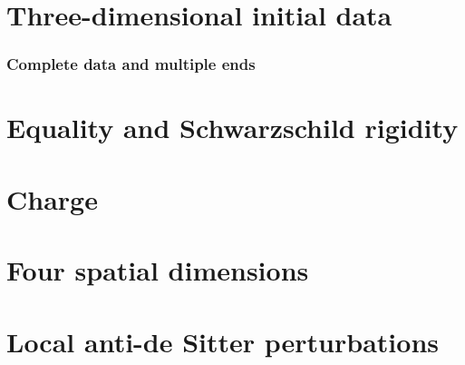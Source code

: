 
\part{Three-dimensional initial data}








\section{Complete data and multiple ends}


\part{Equality and Schwarzschild rigidity}




\part{Charge}










\part{Four spatial dimensions}














\part{Local anti-de Sitter perturbations}







